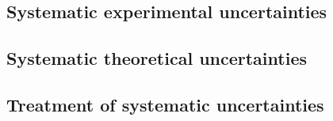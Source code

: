 \subsection{Systematic experimental uncertainties}

\subsection{Systematic theoretical uncertainties}

\subsection{Treatment of systematic uncertainties}
